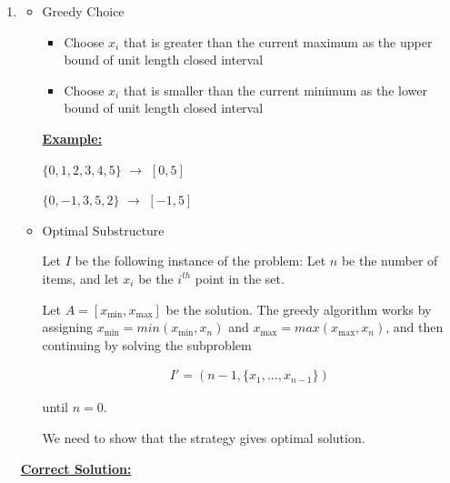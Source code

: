 \documentclass[12pt]{article}
\begin{document}
\begin{enumerate}[1.]
    \item

    \begin{itemize}
        \item Greedy Choice

        \begin{itemize}
            \item Choose $x_i$ that is greater than the current maximum as the upper bound
            of unit length closed interval
            \item Choose $x_i$ that is smaller than the current minimum as the lower bound of unit length
            closed interval
        \end{itemize}

        \bigskip

        \underline{\textbf{Example:}}

        \bigskip

        $\{0,1,2,3,4,5\}$ $\to$ $[0,5]$

        \bigskip

        $\{0,-1,3,5,2\}$ $\to$ $[-1,5]$

        \item Optimal Substructure

        \bigskip

        Let $I$ be the following instance of the problem: Let $n$ be the number of items,
        and let $x_i$ be the $i^{th}$ point in the set.

        \bigskip

        Let $A = [x_{\text{min}}, x_{\text{max}}]$ be the solution. The greedy algorithm works by assigning $x_{\text{min}} = min(x_{\text{min}}, x_n)$ and
        $x_{\text{max}} = max(x_{\text{max}}, x_n)$, and then continuing by solving the subproblem

        \begin{align}
            I' = (n - 1, \{x_1,..., x_{n-1}\})
        \end{align}

        until $n = 0$.

        \bigskip

        We need to show that the strategy gives optimal solution.

    \end{itemize}

    \bigskip

    \begin{mdframed}
        \underline{\textbf{Correct Solution:}}


\end{mdframed}
\end{enumerate}
\end{document}
